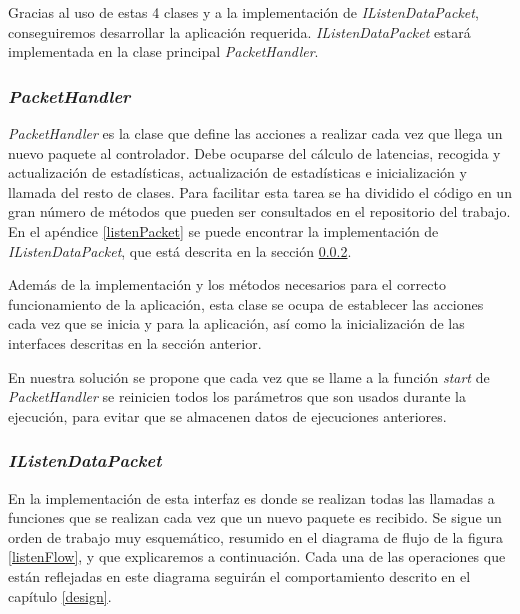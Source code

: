 \documentclass[a4paper,11pt]{book}
\begin{document}
Gracias al uso de estas 4 clases y a la implementación de \textit{IListenDataPacket}, conseguiremos desarrollar la aplicación requerida. \textit{IListenDataPacket} estará implementada en la clase principal \textit{PacketHandler}.

\subsubsection{\textit{PacketHandler}}
\textit{PacketHandler} es la clase que define las acciones a realizar cada vez que llega un nuevo paquete al controlador. Debe ocuparse del cálculo de latencias, recogida y actualización de estadísticas, actualización de estadísticas e inicialización y llamada del resto de clases. Para facilitar esta tarea se ha dividido el código en un gran número de métodos que pueden ser consultados en el repositorio del trabajo. En el apéndice \ref{listenPacket} se puede encontrar la implementación de \textit{IListenDataPacket}, que está descrita en la sección \ref{listenDataPacket}.

Además de la implementación y los métodos necesarios para el correcto funcionamiento de la aplicación, esta clase se ocupa de establecer las acciones cada vez que se inicia y para la aplicación, así como la inicialización de las interfaces descritas en la sección anterior. 

En nuestra solución se propone que cada vez que se llame a la función \textit{start} de \textit{PacketHandler} se reinicien todos los parámetros que son usados durante la ejecución, para evitar que se almacenen datos de ejecuciones anteriores.

\subsubsection{\textit{IListenDataPacket}}\label{listenDataPacket}
En la implementación de esta interfaz es donde se realizan todas las llamadas a funciones que se realizan cada vez que un nuevo paquete es recibido. Se sigue un orden de trabajo muy esquemático, resumido en el diagrama de flujo de la figura \ref{listenFlow}, y que explicaremos a continuación. Cada una de las operaciones que están reflejadas en este diagrama seguirán el comportamiento descrito en el capítulo \ref{design}. 
\end{document}

